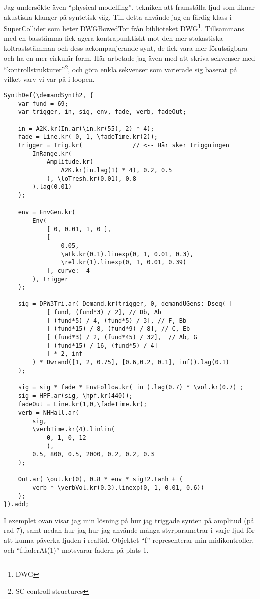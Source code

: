 \documentclass{article}
\renewcommand{\baselinestretch}{1.5}
\begin{document}

	Jag undersökte även ``physical modelling'', tekniken att framställa ljud som liknar akustiska klanger på
	syntetisk väg. Till detta använde jag en färdig klass i SuperCollider som heter DWGBowedTor från
	biblioteket DWG\footnote{DWG}. Tillsammans med en basstämma fick agera kontrapunktiskt mot den mer
	stokastiska koltraststämman och dess ackompanjerande synt, de fick vara mer förutsägbara och ha en mer
	cirkulär form. Här arbetade jag även med att skriva sekvenser med ``kontrollstrukturer''\footnote{SC
	controll structures}, och göra enkla sekvenser som varierade sig baserat på vilket varv vi var på i
	loopen. 
	\pagebreak

\renewcommand{\baselinestretch}{1}
\begin{lstlisting}[style=SuperCollider-IDE, caption=Amplitudtriggad synt]
SynthDef(\demandSynth2, {
	var fund = 69;
	var trigger, in, sig, env, fade, verb, fadeOut;

	in = A2K.kr(In.ar(\in.kr(55), 2) * 4);
	fade = Line.kr( 0, 1, \fadeTime.kr(2));
	trigger = Trig.kr(			    // <-- Här sker triggningen
		InRange.kr( 
			Amplitude.kr(
				A2K.kr(in.lag(1) * 4), 0.2, 0.5
			), \loTresh.kr(0.01), 0.8 
		).lag(0.01)
	);

	env = EnvGen.kr(
		Env( 
			[ 0, 0.01, 1, 0 ],
			[
				0.05,
				\atk.kr(0.1).linexp(0, 1, 0.01, 0.3),
				\rel.kr(1).linexp(0, 1, 0.01, 0.39) 
			], curve: -4
		), trigger
	);

	sig = DPW3Tri.ar( Demand.kr(trigger, 0, demandUGens: Dseq( [ 
			[ fund, (fund*3) / 2], // Db, Ab
			[ (fund*5) / 4, (fund*5) / 3], // F, Bb
			[ (fund*15) / 8, (fund*9) / 8], // C, Eb
			[ (fund*3) / 2, (fund*45) / 32],  // Ab, G
			[ (fund*15) / 16, (fund*5) / 4]
			] * 2, inf
		) * Dwrand([1, 2, 0.75], [0.6,0.2, 0.1], inf)).lag(0.1)
	);

	sig = sig * fade * EnvFollow.kr( in ).lag(0.7) * \vol.kr(0.7) ;
	sig = HPF.ar(sig, \hpf.kr(440));
	fadeOut = Line.kr(1,0,\fadeTime.kr);
	verb = NHHall.ar(
		sig, 
		\verbTime.kr(4).linlin(
			0, 1, 0, 12
			), 
		0.5, 800, 0.5, 2000, 0.2, 0.2, 0.3
	);

	Out.ar( \out.kr(0), 0.8 * env * sig!2.tanh + ( 
		verb * \verbVol.kr(0.3).linexp(0, 1, 0.01, 0.6))
	);  
}).add;
\end{lstlisting}
\renewcommand{\baselinestretch}{1.5}


  I exemplet ovan visar jag min lösning på hur jag triggade synten på amplitud (på rad 7), samt nedan hur jag
  hur jag använde många styrparametrar i varje ljud för att kunna påverka ljuden i realtid. Objektet ``f''
  representerar min midikontroller, och ``f.faderAt(1)'' motsvarar fadern på plats 1.
\end{document}
